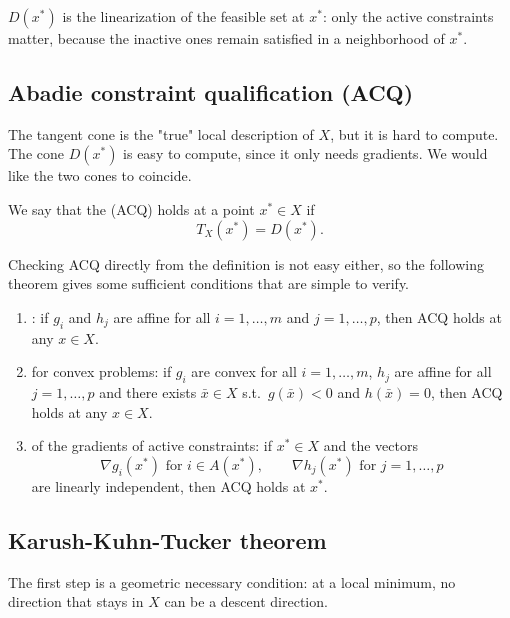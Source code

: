 $D(x^*)$ is the linearization of the feasible set at $x^*$: only the active constraints matter, because the inactive ones remain satisfied in a neighborhood of $x^*$.

\subsection{Abadie constraint qualification (ACQ)}

The tangent cone is the "true" local description of $X$, but it is hard to compute. The cone $D(x^*)$ is easy to compute, since it only needs gradients. We would like the two cones to coincide.

\begin{definition}
    We say that the  (ACQ) holds at a point $x^* \in X$ if
    \[
        T_X(x^*) = D(x^*).
    \]
\end{definition}

Checking ACQ directly from the definition is not easy either, so the following theorem gives some sufficient conditions that are simple to verify.

\begin{theorem}
    \begin{enumerate}[label=\alph*)]
        \item {}: if $g_i$ and $h_j$ are affine for all $i = 1, \dots, m$ and $j = 1, \dots, p$, then ACQ holds at any $x \in X$.
        \item {} for convex problems: if $g_i$ are convex for all $i = 1, \dots, m$, $h_j$ are affine for all $j = 1, \dots, p$ and there exists $\bar{x} \in X$ s.t.\ $g(\bar{x}) < 0$ and $h(\bar{x}) = 0$, then ACQ holds at any $x \in X$.
        \item {} of the gradients of active constraints: if $x^* \in X$ and the vectors
        \[
            \nabla g_i(x^*) \text{ for } i \in A(x^*), \qquad \nabla h_j(x^*) \text{ for } j = 1, \dots, p
        \]
        are linearly independent, then ACQ holds at $x^*$.
    \end{enumerate}
\end{theorem}

\subsection{Karush-Kuhn-Tucker theorem}

The first step is a geometric necessary condition: at a local minimum, no direction that stays in $X$ can be a descent direction.

